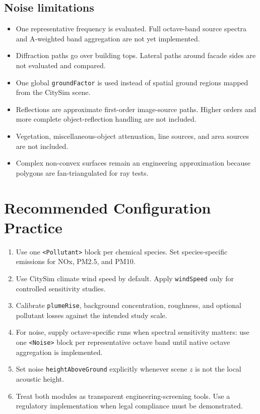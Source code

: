 \documentclass[11pt,a4paper]{article}
\newcommand{\code}[1]{\texttt{#1}}
\begin{document}
\subsection{Noise limitations}

\begin{itemize}
  \item One representative frequency is evaluated. Full octave-band source
        spectra and A-weighted band aggregation are not yet implemented.
  \item Diffraction paths go over building tops. Lateral paths around facade
        sides are not evaluated and compared.
  \item One global \code{groundFactor} is used instead of spatial ground
        regions mapped from the CitySim scene.
  \item Reflections are approximate first-order image-source paths. Higher
        orders and more complete object-reflection handling are not included.
  \item Vegetation, miscellaneous-object attenuation, line sources, and area
        sources are not included.
  \item Complex non-convex surfaces remain an engineering approximation because
        polygons are fan-triangulated for ray tests.
\end{itemize}

\section{Recommended Configuration Practice}

\begin{enumerate}
  \item Use one \code{<Pollutant>} block per chemical species. Set
        species-specific emissions for NOx, PM2.5, and PM10.
  \item Use CitySim climate wind speed by default. Apply \code{windSpeed} only
        for controlled sensitivity studies.
  \item Calibrate \code{plumeRise}, background concentration, roughness, and
        optional pollutant losses against the intended study scale.
  \item For noise, supply octave-specific runs when spectral sensitivity
        matters: use one \code{<Noise>} block per representative octave band
        until native octave aggregation is implemented.
  \item Set noise \code{heightAboveGround} explicitly whenever scene $z$ is not
        the local acoustic height.
  \item Treat both modules as transparent engineering-screening tools. Use a
        regulatory implementation when legal compliance must be demonstrated.
\end{enumerate}
\end{document}
